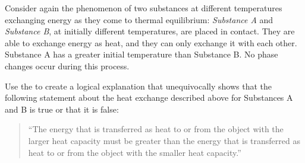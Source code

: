 \label{fnt1.2.1-1}

Consider again the phenomenon of two substances at different temperatures exchanging energy as they come to thermal equilibrium: \emph{Substance A} and \emph{Substance B}, at initially different temperatures, are placed in contact. They are able to exchange energy as heat, and they can only exchange it with each other. Substance A has a greater initial temperature than Substance B. No phase changes occur during this process.

Use the \EnergyInteractionModel{} to create a logical explanation that unequivocally shows that the following statement about the heat exchange described above for Substances A and B is true or that it is false:

\begin{quote}
	``The energy that is transferred as heat to or from the object with the larger heat capacity must be greater than the energy that is transferred as heat to or from the object with the smaller heat capacity.''
\end{quote}